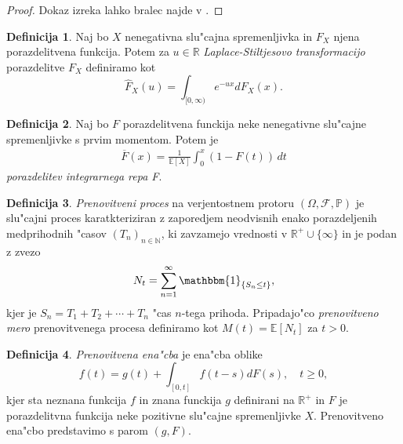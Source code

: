 \documentclass[12pt, a4paper, reqno]{amsart}
\theoremstyle{definition}
\newtheorem{definicija}{Definicija}[section]
\theoremstyle{plain}
\newcommand{\R}{\mathbb{R}}
\newcommand{\N}{\mathbb{N}}
\newcommand{\E}{\mathbb{E}}
\newcommand{\Prob}{\mathbb{P}}
\newcommand{\1}{\mathds{1}}
\begin{document}
    \begin{proof}
        Dokaz izreka lahko bralec najde v \cite{7}.
    \end{proof} 

    \begin{definicija}
        Naj bo $X$ nenegativna slu"cajna spremenljivka in $F_X$ njena porazdelitvena funkcija. 
        Potem za $u\in\R$ \textit{Laplace-Stiltjesovo transformacijo} porazdelitve $F_X$ definiramo kot
        \begin{equation*}
            \hat{F}_X(u) = \int_{[0, \infty)}e^{-ux}dF_X(x).
        \end{equation*}
        \label{def:LaplaceStiltjesovaTransformacija}
    \end{definicija}

    \begin{definicija}
        Naj bo $F$ porazdelitvena funckija neke nenegativne slu"cajne spremenljivke s prvim 
        momentom. Potem je 
        \begin{align*}
            \overline{F}(x) = \frac{1}{\mathbb{E}[X]} \int_0^x (1 - F(t)) \, dt
        \end{align*}
        \textit{porazdelitev integrarnega repa F}.
        \label{def:porazdelitevintegriranegaRepa}
    \end{definicija}

    \begin{definicija}
        \textit{Prenovitveni proces} na verjentostnem protoru $(\Omega, \mathcal{F}, \Prob)$ je slu"cajni 
        proces
        karatkteriziran z zaporedjem neodvisnih enako porazdeljenih medprihodnih "casov $(T_n)_{n\in\N}$, 
        ki zavzamejo vrednosti v $\R^+\cup\{\infty\}$ in je podan z zvezo 
        \begin{equation*}
            N_t = \sum_{n=1}^{\infty}\mathbbm{1}_{\{S_n\leq t\}},
        \end{equation*}
        kjer je $S_n = T_1 + T_2 + \cdots + T_n$ "cas $n$-tega prihoda. Pripadajo"co 
        \textit{prenovitveno mero} prenovitvenega procesa definiramo kot $M(t) = \E\left[N_t\right]$ za 
        $t > 0$.
        \label{def:PrenovitveniProces}
    \end{definicija}

    \begin{definicija}
        \textit{Prenovitvena ena"cba} je ena"cba oblike 
        \begin{equation*}
            f(t) = g(t) + \int_{[0, t]}f(t - s)dF(s), \quad t\geq 0,
        \end{equation*}
        kjer sta neznana funkcija $f$ in znana funckija $g$ definirani na $\R^+$ in $F$ je 
        porazdelitvna funkcija neke pozitivne slu"cajne spremenljivke $X$. Prenovitveno ena"cbo predstavimo
        s parom $(g, F)$.
        \label{def:prenovitvenaEnacba}
    \end{definicija}
\end{document}
